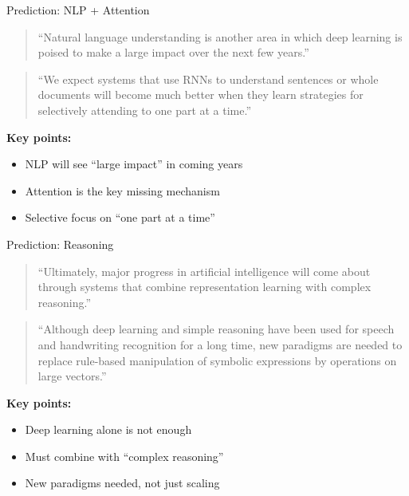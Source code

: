 \begin{frame}{Prediction: NLP + Attention}
    \begin{quote}
        ``Natural language understanding is another area in which deep learning is poised to make a large impact over the next few years.''
    \end{quote}
    
    \vspace{0.5em}
    \begin{quote}
        ``We expect systems that use RNNs to understand sentences or whole documents will become much better when they learn strategies for selectively attending to one part at a time.''
    \end{quote}
    
    \vspace{1em}
    \textbf{Key points:}
    \begin{itemize}
        \item NLP will see ``large impact'' in coming years
        \item Attention is the key missing mechanism
        \item Selective focus on ``one part at a time''
    \end{itemize}
\end{frame}

\begin{frame}{Prediction: Reasoning}
    \begin{quote}
        ``Ultimately, major progress in artificial intelligence will come about through systems that combine representation learning with complex reasoning.''
    \end{quote}
    
    \vspace{0.5em}
    \begin{quote}
        ``Although deep learning and simple reasoning have been used for speech and handwriting recognition for a long time, new paradigms are needed to replace rule-based manipulation of symbolic expressions by operations on large vectors.''
    \end{quote}
    
    \vspace{1em}
    \textbf{Key points:}
    \begin{itemize}
        \item Deep learning alone is not enough
        \item Must combine with ``complex reasoning''
        \item New paradigms needed, not just scaling
    \end{itemize}
\end{frame}

